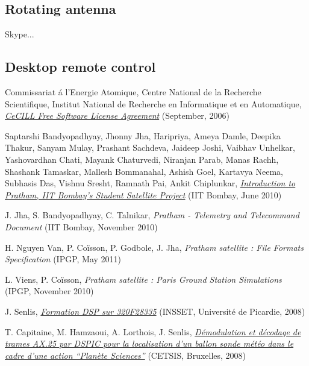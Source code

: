 \documentclass[a4paper]{report}
\begin{document}
\subsection{Rotating antenna}

Skype...

\subsection{Desktop remote control}

\begin{thebibliography}{99}

Commissariat \'a l'Energie Atomique, Centre National de la Recherche Scientifique, Institut National de Recherche en Informatique et en Automatique, {\it \href{http://www.cecill.info/licences/Licence_CeCILL_V2-en.html}{CeCILL Free Software License Agreement}} (September, 2006)

Saptarshi Bandyopadhyay, Jhonny Jha, Haripriya, Ameya Damle, Deepika Thakur, Sanyam Mulay, Prashant Sachdeva, Jaideep Joshi, Vaibhav Unhelkar, Yashovardhan Chati, Mayank Chaturvedi, Niranjan Parab, Manas Rachh, Shashank Tamaskar, Mallesh Bommanahal, Ashish Goel, Kartavya Neema, Subhasis Das, Vishnu Sresht, Ramnath Pai, Ankit Chiplunkar, {\it \href{http://www.aero.iitb.ac.in/pratham/otherdocs/IIT-B_Paper_Pratham_20thApr.pdf}{Introduction to Pratham, IIT Bombay’s Student Satellite Project}} (IIT Bombay, June 2010)

J. Jha, S. Bandyopadhyay, C. Talnikar, {\it Pratham - Telemetry and Telecommand Document} (IIT Bombay, November 2010)

H. Nguyen Van, P. Co\"isson, P. Godbole, J. Jha, {\it Pratham satellite : File Formats Specification} (IPGP, May 2011)

L. Viens, P. Co\"isson, {\it Pratham satellite : Paris Ground Station Simulations} (IPGP, November 2010)

J. Senlis, {\it \href{http://jgsenlis.free.fr/dsp_28335.htm}{Formation DSP sur 320F28335}} (INSSET, Universit\'e de Picardie, 2008)

T. Capitaine, M. Hamzaoui, A. Lorthois, J. Senlis, {\it \href{http://jgsenlis.free.fr/ax25/Cetsis2008_AX25.pdf}{D\'emodulation et d\'ecodage de trames AX.25 par DSPIC pour la localisation d'un ballon sonde m\'et\'eo dans le cadre d'une action ``Plan\`ete Sciences''}} (CETSIS, Bruxelles, 2008)


\end{thebibliography}
\end{document}
